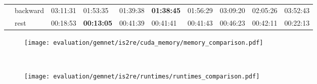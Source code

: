 \begin{figure}[H]
{\begin{tabular}{ll|l|l|l|l|l|l|l|l|}
    \multicolumn{1}{|l|}{}                          & backward    & 03:11:31 & 01:53:35          & 01:39:38       & \textbf{01:38:45} & 01:56:29 & 03:09:20      & 02:05:26 & 03:52:43          \\ \cline{2-10} 
    \multicolumn{1}{|l|}{}                          & rest        & 00:18:53 & \textbf{00:13:05} & 00:41:39       & 00:41:41          & 00:41:43 & 00:46:23      & 00:42:11 & 00:22:13          \\ \hline
    \end{tabular}}

    \vspace*{2em}

    \begin{subfigure}[t]{0.48\textwidth}
        \centering
        \texttt{[image: evaluation/gemnet/is2re/cuda\_memory/memory\_comparison.pdf]}
    \end{subfigure}%
    ~
    \begin{subfigure}[t]{0.48\textwidth}
        \centering
        \texttt{[image: evaluation/gemnet/is2re/runtimes/runtimes\_comparison.pdf]}
    \end{subfigure}


\end{figure}
